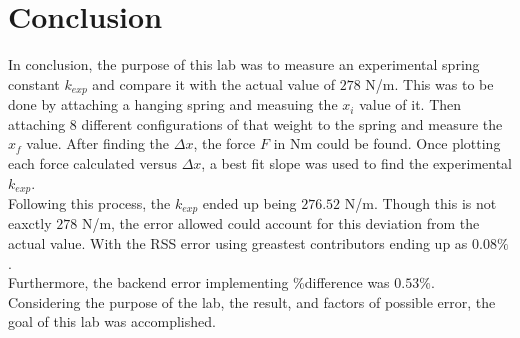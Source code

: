 \let\clearpage\relax\chapter{Conclusion}
\endgroup

In conclusion, the purpose of this lab was to measure an experimental spring 
constant $k_{exp}$ and compare it with the actual value of $278$ N/m. This was to be done 
by attaching a hanging spring and measuing the $x_i$ value of it. Then attaching
8 different configurations of that weight to the spring and measure the $x_f$
value. After finding the $\Delta x$, the force $F$ in Nm could be found.
Once plotting each force calculated versus $\Delta x$, a best fit slope was 
used to find the experimental $k_{exp}$.\\

\noindent Following this process, the $k_{exp}$ ended up being $276.52$ N/m. Though this is not
eaxctly $278$ N/m, the error allowed could account for this deviation from the actual
value. With the RSS error using greastest contributors ending up as $0.08\%$.\\

\noindent Furthermore, the backend error implementing \%difference was $0.53\%$.\\

\noindent Considering the purpose of the lab, the result, and factors of possible error,
the goal of this lab was accomplished.